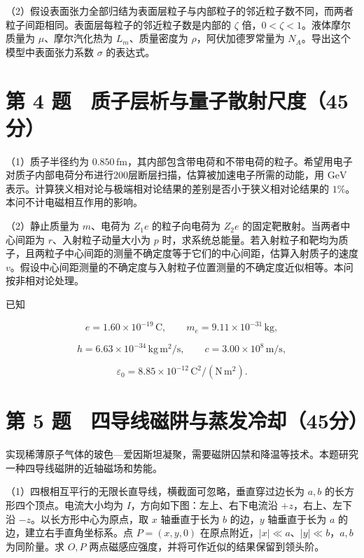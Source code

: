 \documentclass[12pt,a4paper,fontset=fandol]{ctexart}
\begin{document}
（2）假设表面张力全部归结为表面层粒子与内部粒子的邻近粒子数不同，而两者粒子间距相同。表面层每粒子的邻近粒子数是内部的
\(\zeta\) 倍，\(0<\zeta<1\)。液体摩尔质量为 \(\mu\)、摩尔汽化热为
\(L_m\)、质量密度为 \(\rho\)，阿伏加德罗常量为
\(N_A\)。导出这个模型中表面张力系数 \(\sigma\) 的表达式。

\clearpage

\section{第 4
题　质子层析与量子散射尺度（45分）}\label{ux7b2c-4-ux9898-ux8d28ux5b50ux5c42ux6790ux4e0eux91cfux5b50ux6563ux5c04ux5c3aux5ea645ux5206}

（1）质子半径约为
\(0.850\,\mathrm{fm}\)，其内部包含带电荷和不带电荷的粒子。希望用电子对质子内部电荷分布进行200层断层扫描，估算被加速电子所需的动能，用
\(\mathrm{GeV}\)
表示。计算狭义相对论与极端相对论结果的差别是否小于狭义相对论结果的
\(1\%\)。本问不计电磁相互作用的影响。

（2）静止质量为 \(m\)、电荷为 \(Z_1e\) 的粒子向电荷为 \(Z_2e\)
的固定靶散射。当两者中心间距为 \(r\)、入射粒子动量大小为 \(p\)
时，求系统总能量。若入射粒子和靶均为质子，且两粒子中心间距的测量不确定度等于它们的中心间距，估算入射质子的速度
\(v\)。假设中心间距测量的不确定度与入射粒子位置测量的不确定度近似相等。本问按非相对论处理。

已知

\[e=1.60\times10^{-19}\,\mathrm C,
\qquad m_e=9.11\times10^{-31}\,\mathrm{kg},\]

\[h=6.63\times10^{-34}\,\mathrm{kg\,m^2/s},
\qquad c=3.00\times10^8\,\mathrm{m/s},\]

\[\varepsilon_0=8.85\times10^{-12}\,\mathrm{C^2/(N\,m^2)}.\]

\clearpage

\section{第 5
题　四导线磁阱与蒸发冷却（45分）}\label{ux7b2c-5-ux9898-ux56dbux5bfcux7ebfux78c1ux9631ux4e0eux84b8ux53d1ux51b7ux537445ux5206}

实现稀薄原子气体的玻色---爱因斯坦凝聚，需要磁阱囚禁和降温等技术。本题研究一种四导线磁阱的近轴磁场和势能。

（1）四根相互平行的无限长直导线，横截面可忽略，垂直穿过边长为 \(a,b\)
的长方形四个顶点。电流大小均为 \(I\)，方向如下图：左上、右下电流沿
\(+z\)，右上、左下沿 \(-z\)。以长方形中心为原点，取 \(x\) 轴垂直于长为
\(b\) 的边，\(y\) 轴垂直于长为 \(a\) 的边，建立右手直角坐标系。点
\(P=(x,y,0)\) 在原点附近，\(|x|\ll a\)、\(|y|\ll b\)，\(a,b\)
为同阶量。求 \(O,P\) 两点磁感应强度，并将可作近似的结果保留到领头阶。
\end{document}
